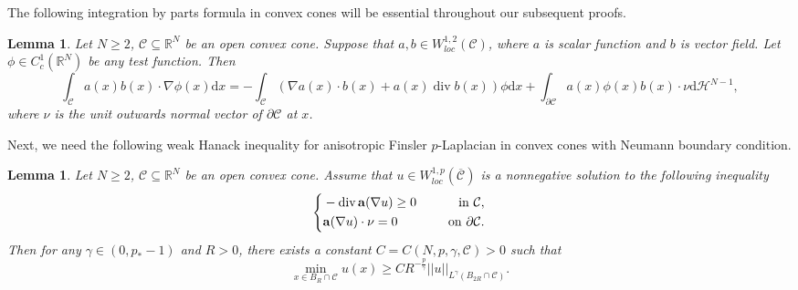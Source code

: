 \documentclass[12pt]{amsart}
\newtheorem{lem}[thm]{Lemma}
\theoremstyle{definition}
\theoremstyle{remark}
\theoremstyle{conclusion}
\theoremstyle{conjecture}
\numberwithin{equation}{section}
\begin{document}
The following integration by parts formula in convex cones will be essential throughout our subsequent proofs.
\begin{lem}\label{int part}
 Let $N\geq2$, $\mathcal{C}\subseteq\mathbb{R}^{N}$ be an open convex cone. Suppose that $a,b\in W^{1,2}_{loc}(\mathcal{C})$, where $a$ is scalar function and $b$ is vector field. Let $\phi\in C^{1}_c(\mathbb{R}^N)$ be any test function. Then
 $$\int_{\mathcal{C}}a(x)b(x)\cdot\nabla\phi(x)\mathrm{d}x=-\int_{\mathcal{C}}(\nabla a(x)\cdot b(x)+a(x)\operatorname{div}b(x))\phi\mathrm{d}x+\int_{\partial\mathcal{C}}a(x)\phi(x)b(x)\cdot\nu\mathrm{d}\mathcal{H}^{N-1},$$
 where $\nu$ is the unit outwards normal vector of $\partial\mathcal{C}$ at $x$.
\end{lem}


Next, we need the following weak Hanack inequality for anisotropic Finsler $p$-Laplacian in convex cones with Neumann boundary condition.
\begin{lem}\label{Hanack}
Let $N\geq2$, $\mathcal{C}\subseteq\mathbb{R}^{N}$ be an open convex cone. Assume that $u\in W^{1,p}_{loc}(\overline{\mathcal{C}})$ is a nonnegative solution to the following inequality
  \begin{equation*}
      \left\{
          \begin{aligned}
          &-\operatorname{div}{\bf{a}}(\nabla u)\geq0 \quad\,\,\, &{\rm{in}} \,\, \mathcal{C}, \\
          &{\bf{a}}(\nabla u)\cdot \nu =0 \quad\,\,\, &{\rm{on}} \,\, \partial\mathcal{C}.
          \end{aligned}
          \right.
    \end{equation*}
Then for any $\gamma\in(0,p_*-1)$ and $R>0$, there exists a constant $C=C(N,p,\gamma,\mathcal{C})>0$ such that
\begin{equation*}
  \min\limits_{x\in B_R\cap\mathcal{C}}u(x)\geq CR^{-\frac{p}{\gamma}}||u||_{L^{\gamma}(B_{2R}\cap\mathcal{C})}.
\end{equation*}
\end{lem}
\end{document}
